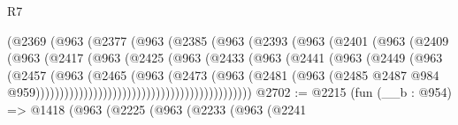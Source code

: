 \begin{lexlean}{R7}
\begin{coremodule}
                                (@2369
                                  (@963
                                    (@2377
                                      (@963
                                        (@2385
                                          (@963
                                            (@2393
                                              (@963
                                                (@2401
                                                  (@963
                                                    (@2409
                                                      (@963
                                                        (@2417
                                                          (@963
                                                            (@2425
                                                              (@963
                                                                (@2433
                                                                  (@963
                                                                    (@2441
                                                                      (@963
                                                                        (@2449
                                                                          (@963
                                                                            (@2457
                                                                              (@963
                                                                                (@2465
                                                                                  (@963
                                                                                    (@2473
                                                                                      (@963
                                                                                        (@2481
                                                                                          (@963
                                                                                            (@2485
                                                                                              @2487
                                                                                              @984
                                                                                              @959)))))))))))))))))))))))))))))))))))))))))))))
@2702 := @2215
    (fun (__b : @954) =>
    @1418
      (@963
        (@2225
          (@963
            (@2233
              (@963
                (@2241

\end{coremodule}
\end{lexlean}
